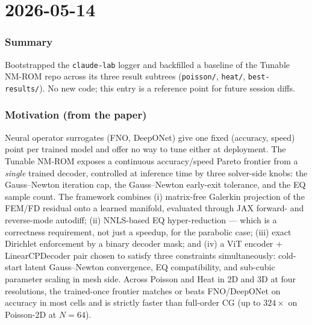 \section{2026-05-14}


\subsubsection*{Summary}
Bootstrapped the \texttt{claude-lab} logger and backfilled a baseline of the
Tunable NM-ROM repo across its three result subtrees (\texttt{poisson/},
\texttt{heat/}, \texttt{best-results/}). No new code; this entry is a
reference point for future session diffs.

\subsubsection*{Motivation (from the paper)}
Neural operator surrogates (FNO, DeepONet) give one fixed
(accuracy, speed) point per trained model and offer no way to tune either
at deployment. The Tunable NM-ROM exposes a continuous accuracy/speed
Pareto frontier from a \emph{single} trained decoder, controlled at
inference time by three solver-side knobs: the Gauss--Newton iteration
cap, the Gauss--Newton early-exit tolerance, and the EQ sample count.
The framework combines (i) matrix-free Galerkin projection of the FEM/FD
residual onto a learned manifold, evaluated through JAX forward- and
reverse-mode autodiff; (ii) NNLS-based EQ hyper-reduction --- which is a
correctness requirement, not just a speedup, for the parabolic case;
(iii) exact Dirichlet enforcement by a binary decoder mask; and (iv) a
ViT encoder + LinearCPDecoder pair chosen to satisfy three constraints
simultaneously: cold-start latent Gauss--Newton convergence, EQ
compatibility, and sub-cubic parameter scaling in mesh side. Across
Poisson and Heat in 2D and 3D at four resolutions, the trained-once
frontier matches or beats FNO/DeepONet on accuracy in most cells and is
strictly faster than full-order CG (up to $324\times$ on Poisson-2D at
$N{=}64$).

